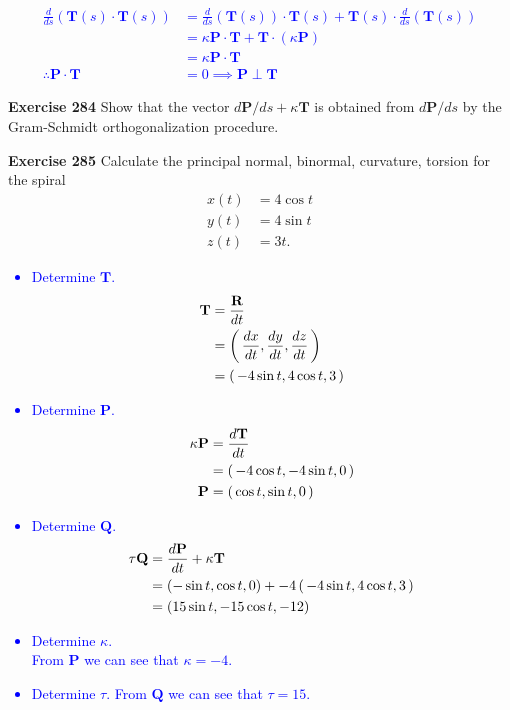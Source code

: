 \documentclass[12pt,a4paper]{report}
\newcommand{\BLUE}[1]{\textcolor{blue}{#1}}
\begin{document}
\begin{description}
\BLUE{
\begin{align*}
	\frac{d}{ds}(\textbf{T}(s)\cdot\textbf{T}(s)) &= \frac{d}{ds}(\textbf{T}(s))\cdot\textbf{T}(s) + \textbf{T}(s)\cdot\frac{d}{ds}(\textbf{T}(s)) \\
		&= \kappa\textbf{P}\cdot\textbf{T} + \textbf{T}\cdot(\kappa\textbf{P}) \\
		&= \kappa\textbf{P}\cdot\textbf{T} \\
	\therefore \textbf{P}\cdot\textbf{T} &= 0 \implies \textbf{P} \perp \textbf{T}
\end{align*}
}

\item \textbf{Exercise 284} Show that the vector $d\textbf{P}/ds + \kappa\textbf{T}$ is obtained from $d\textbf{P}/ds$ by the Gram-Schmidt orthogonalization procedure.

\item \textbf{Exercise 285} Calculate the principal normal, binormal, curvature, torsion for the spiral
\begin{align*}
	x(t) &= 4\cos t \\
	y(t) &= 4\sin t \\
	z(t) &= 3t.
\end{align*}

\newcommand{\DT}[1]{\frac{d{#1}}{dt}}
\BLUE{
\begin{itemize}
	\item Determine $\textbf{T}$.
		\begin{align*}
			\textbf{T} &= \frac{\textbf{R}}{dt} \\
				&= \PAREN{\DT{x}, \DT{y}, \DT{z}} \\
				&= \PAREN{ -4\sin t, 4\cos t, 3}
		\end{align*}
	\item Determine $\textbf{P}$.
		\begin{align*}
			\kappa\textbf{P} &= \DT{\textbf{T}} \\
				&= \PAREN{-4\cos t, -4\sin t, 0} \\
			\textbf{P} &= \PAREN{\cos t, \sin t, 0}
		\end{align*}
	\item Determine $\textbf{Q}$.
		\begin{align*}
			\tau\textbf{Q} &= \DT{\textbf{P}}+\kappa\textbf{T} \\
				&= ( -\sin t, \cos t, 0) + -4 \PAREN{ -4\sin t, 4\cos t, 3} \\
				&= (15\sin t, -15\cos t, -12)
		\end{align*}
	\item Determine $\kappa$.\\
		From $\textbf{P}$ we can see that $\kappa = -4$.
	\item Determine $\tau$.
		From $\textbf{Q}$ we can see that $\tau = 15$.
\end{itemize}
}


\end{description}
\end{document}
